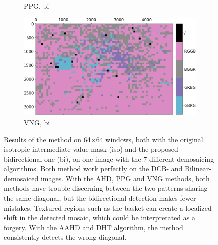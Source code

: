 \documentclass{ipol}
\begin{document}
\begin{figure}[ht]
\begin{subfigure}[c]{.14\linewidth}
\caption{PPG, bi}
\end{subfigure}%
\begin{subfigure}[c]{.14\linewidth}
\includegraphics[width=\linewidth]{images/bike/VNG/bid_64_grids.png}
\caption{VNG, bi}
\end{subfigure}
\caption{Results of the method on 64×64 windows, both with the original isotropic intermediate value mask (iso) and the proposed bidirectional one (bi), on one image with the 7 different demosaicing algorithms. Both method work perfectly on the DCB- and Bilinear-demosaiced images. With the AHD, PPG and VNG methods, both methods have trouble discerning between the two patterns sharing the same diagonal, but the bidirectional detection makes fewer mistakes. Textured regions such as the basket can create a localized shift in the detected mosaic, which could be interpretated as a forgery.
With the AAHD and DHT algorithm, the method consistently detects the wrong diagonal.}
\label{fig:bike}
\end{figure}
\end{document}

